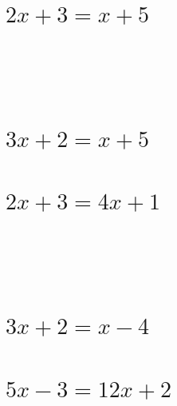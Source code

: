 \documentclass[template=tabling,81pt,headonall]{azmoon}
\begin{document}
\begin{questions}
{\begin{parts}[2]
\part{$2x + 3 = x + 5$}
‌\\‌\\‌\\\part{$3x + 2 = x + 5$}
\part{$2x + 3 = 4x + 1$}
‌\\‌\\‌\\\part{$3x + 2 = x - 4$}
\part{$5x - 3 = 12x + 2$}
\end{parts}
‌
\\‌
\\‌
\\‌
\\‌
\\
    }
\end{questions}
\end{document}

